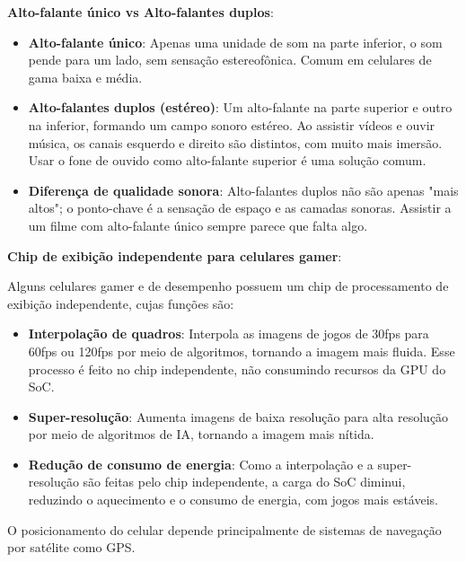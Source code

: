 \textbf{Alto-falante único vs Alto-falantes duplos}:

\begin{itemize}
  \item \textbf{Alto-falante único}: Apenas uma unidade de som na parte inferior, o som pende para um lado, sem sensação estereofônica. Comum em celulares de gama baixa e média.
  \item \textbf{Alto-falantes duplos (estéreo)}: Um alto-falante na parte superior e outro na inferior, formando um campo sonoro estéreo. Ao assistir vídeos e ouvir música, os canais esquerdo e direito são distintos, com muito mais imersão. Usar o fone de ouvido como alto-falante superior é uma solução comum.
  \item \textbf{Diferença de qualidade sonora}: Alto-falantes duplos não são apenas "mais altos"; o ponto-chave é a sensação de espaço e as camadas sonoras. Assistir a um filme com alto-falante único sempre parece que falta algo.
\end{itemize}

\textbf{Chip de exibição independente para celulares gamer}:

Alguns celulares gamer e de desempenho possuem um chip de processamento de exibição independente, cujas funções são:

\begin{itemize}
  \item \textbf{Interpolação de quadros}: Interpola as imagens de jogos de 30fps para 60fps ou 120fps por meio de algoritmos, tornando a imagem mais fluida. Esse processo é feito no chip independente, não consumindo recursos da GPU do SoC.
  \item \textbf{Super-resolução}: Aumenta imagens de baixa resolução para alta resolução por meio de algoritmos de IA, tornando a imagem mais nítida.
  \item \textbf{Redução de consumo de energia}: Como a interpolação e a super-resolução são feitas pelo chip independente, a carga do SoC diminui, reduzindo o aquecimento e o consumo de energia, com jogos mais estáveis.
\end{itemize}


O posicionamento do celular depende principalmente de sistemas de navegação por satélite como GPS.

